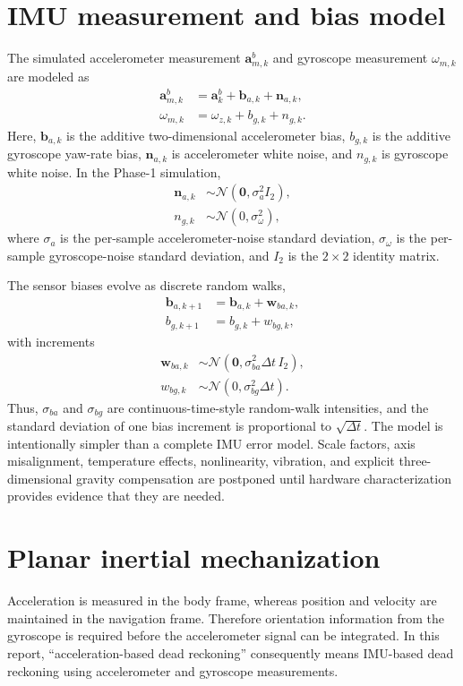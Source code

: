 \section{IMU measurement and bias model}
The simulated accelerometer measurement $\bm{a}_{m,k}^{b}$ and gyroscope measurement $\omega_{m,k}$ are modeled as
\begin{align}
\bm{a}_{m,k}^{b} &= \bm{a}_{k}^{b}+\bm{b}_{a,k}+\bm{n}_{a,k},\\
\omega_{m,k} &= \omega_{z,k}+b_{g,k}+n_{g,k}.
\end{align}
Here, $\bm{b}_{a,k}$ is the additive two-dimensional accelerometer bias, $b_{g,k}$ is the additive gyroscope yaw-rate bias, $\bm{n}_{a,k}$ is accelerometer white noise, and $n_{g,k}$ is gyroscope white noise. In the Phase-1 simulation,
\begin{align}
\bm{n}_{a,k} &\sim \mathcal{N}(\bm{0},\sigma_a^2 I_2),\\
n_{g,k} &\sim \mathcal{N}(0,\sigma_{\omega}^2),
\end{align}
where $\sigma_a$ is the per-sample accelerometer-noise standard deviation, $\sigma_{\omega}$ is the per-sample gyroscope-noise standard deviation, and $I_2$ is the $2\times2$ identity matrix.

The sensor biases evolve as discrete random walks,
\begin{align}
\bm{b}_{a,k+1} &= \bm{b}_{a,k}+\bm{w}_{ba,k},\\
b_{g,k+1} &= b_{g,k}+w_{bg,k},
\end{align}
with increments
\begin{align}
\bm{w}_{ba,k} &\sim \mathcal{N}(\bm{0},\sigma_{ba}^2\Delta t\,I_2),\\
w_{bg,k} &\sim \mathcal{N}(0,\sigma_{bg}^2\Delta t).
\end{align}
Thus, $\sigma_{ba}$ and $\sigma_{bg}$ are continuous-time-style random-walk intensities, and the standard deviation of one bias increment is proportional to $\sqrt{\Delta t}$. The model is intentionally simpler than a complete IMU error model. Scale factors, axis misalignment, temperature effects, nonlinearity, vibration, and explicit three-dimensional gravity compensation are postponed until hardware characterization provides evidence that they are needed.

\section{Planar inertial mechanization}
Acceleration is measured in the body frame, whereas position and velocity are maintained in the navigation frame. Therefore orientation information from the gyroscope is required before the accelerometer signal can be integrated. In this report, ``acceleration-based dead reckoning'' consequently means IMU-based dead reckoning using accelerometer and gyroscope measurements.

